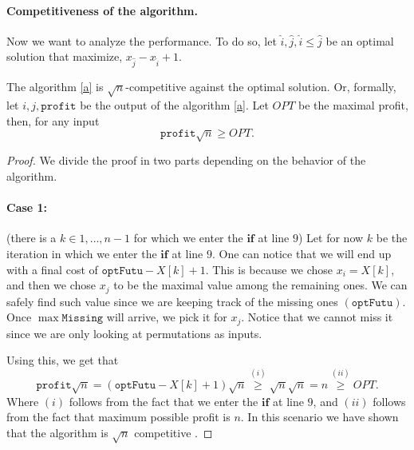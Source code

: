 \documentclass[11pt]{article}
\begin{document}
\begin{enumerate}
        \paragraph*{Competitiveness of the algorithm.}
        Now we want to analyze the performance. To do so, let $\hat i, \hat j, \hat i \leq \hat j$ be an optimal solution that maximize, $x_{\hat j}-x_{\hat i}+1$. 
        \begin{theorem} The algorithm \ref{a} is $\sqrt{n}$-competitive against the optimal solution. Or, formally, let $i, j, \mathtt{profit}$ be the output of the algorithm \ref{a}. Let $OPT$ be the maximal profit, then, for any input
            \begin{equation*}
                \mathtt{profit}\sqrt{n} \geq OPT.
            \end{equation*}
        \end{theorem}
        \begin{proof}
            We divide the proof in two parts depending on the behavior of the algorithm. 
            \paragraph*{Case 1:}(there is a $k \in {1,\dots,n-1}$ for which we enter the $\mathbf{if}$ at line $9$) Let for now $k$ be the iteration in which we enter the $\mathbf{if}$ at line $9$. One can notice that we will end up with a final cost of $\mathtt{optFutu} - X[k] + 1$. This is because we chose $x_i = X[k]$, and then we chose $x_j$ to be the maximal value among the remaining ones. We can safely find such value since we are keeping track of the missing ones $(\mathtt{optFutu})$. Once $\max \mathtt{Missing}$ will arrive, we pick it for $x_j$. Notice that we cannot miss it since we are only looking at permutations as inputs.

            Using this, we get that
            \begin{equation*}
                \mathtt{profit}\sqrt{n} = (\mathtt{optFutu} - X[k] + 1)\sqrt{n} \stackrel{(i)}{\geq}\sqrt{n}\sqrt{n} = n \stackrel{(ii)}{\geq} OPT.
            \end{equation*}
            Where $(i)$ follows from the fact that we enter the $\mathbf{if}$ at line $9$, and $(ii)$ follows from the fact that maximum possible profit is $n$. In this scenario we have shown that the algorithm is $\sqrt{n}$ competitive .

\end{proof}
\end{enumerate}
\end{document}
